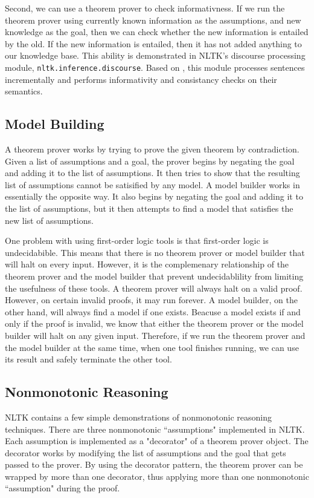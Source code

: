 \documentclass{article}
\newcommand{\dhgcode}[1]{{\tt #1}}
\begin{document}
Second, we can use a theorem prover to check informativness.  If we run the theorem prover using currently known information as the assumptions, and new knowledge as the goal, then we can check whether the new information is entailed by the old.  If the new information is entailed, then it has not added anything to our knowledge base.  This ability is demonstrated in NLTK's discourse processing module, \dhgcode{nltk.inference.discourse}.  Based on \cite{BB}, this module processes sentences incrementally and performs informativity and consistancy checks on their semantics.

\subsection{Model Building}
A theorem prover works by trying to prove the given theorem by contradiction.  Given a list of assumptions and a goal, the prover begins by negating the goal and adding it to the list of assumptions.  It then tries to show that the resulting list of assumptions cannot be satisified by any model.  A model builder works in essentially the opposite way.  It also begins by negating the goal and adding it to the list of assumptions, but it then attempts to find a model that satisfies the new list of assumptions.  

One problem with using first-order logic tools is that first-order logic is undecidabible.  This means that there is no theorem prover or model builder that will halt on every input.  However, it is the complemenary relationship of the theorem prover and the model builder that prevent undecidablility from limiting the usefulness of these tools.  A theorem prover will always halt on a valid proof.  However, on certain invalid proofs, it may run forever.  A model builder, on the other hand, will always find a model if one exists.  Beacuse a model exists if and only if the proof is invalid, we know that either the theorem prover or the model builder will halt on any given input.  Therefore, if we run the theorem prover and the model builder at the same time, when one tool finishes running, we can use its result and safely terminate the other tool.


\subsection{Nonmonotonic Reasoning}

NLTK contains a few simple demonstrations of nonmonotonic reasoning techniques.  There are three nonmonotonic ``assumptions" implemented in NLTK.  Each assumption is implemented as a "decorator" of a theorem prover object.  The decorator works by modifying the list of assumptions and the goal that gets passed to the prover.  By using the decorator pattern, the theorem prover can be wrapped by more than one decorator, thus applying more than one nonmonotonic ``assumption" during the proof.
\end{document}

